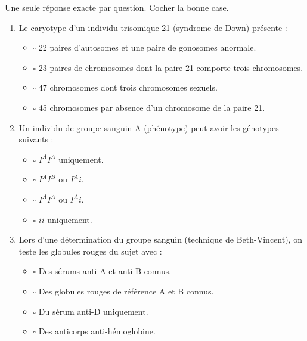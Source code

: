 \documentclass[11pt]{article}
\begin{document}
\begin{exercice}
Une seule réponse exacte par question. Cocher la bonne case.
\begin{enumerate}
    \item Le caryotype d'un individu trisomique 21 (syndrome de Down) présente :
    \begin{itemize}
        \item $\square$ 22 paires d'autosomes et une paire de gonosomes anormale.
        \item $\square$ 23 paires de chromosomes dont la paire 21 comporte trois chromosomes.
        \item $\square$ 47 chromosomes dont trois chromosomes sexuels.
        \item $\square$ 45 chromosomes par absence d'un chromosome de la paire 21.
    \end{itemize}
    \item Un individu de groupe sanguin A (phénotype) peut avoir les génotypes suivants :
    \begin{itemize}
        \item $\square$ $I^A I^A$ uniquement.
        \item $\square$ $I^A I^B$ ou $I^A i$.
        \item $\square$ $I^A I^A$ ou $I^A i$.
        \item $\square$ $ii$ uniquement.
    \end{itemize}
    \item Lors d'une détermination du groupe sanguin (technique de Beth-Vincent), on teste les globules rouges du sujet avec :
    \begin{itemize}
        \item $\square$ Des sérums anti-A et anti-B connus.
        \item $\square$ Des globules rouges de référence A et B connus.
        \item $\square$ Du sérum anti-D uniquement.
        \item $\square$ Des anticorps anti-hémoglobine.
    \end{itemize}
\end{enumerate}
\end{exercice}
\end{document}
